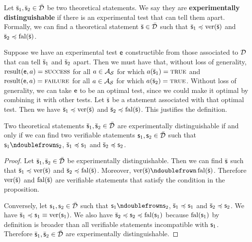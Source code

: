 \documentclass[11pt,letterpaper,fleqn]{memoir} %
\begin{document}
\begin{mathSection}
\begin{defn}\label{1_def_experimentally_distinguishable}
	Let $\bar{\mathsf{s}}_1, \bar{\mathsf{s}}_2 \in \bar{\mathcal{D}}$ be two theoretical statements. We say they are \textbf{experimentally distinguishable} if there is an experimental test that can tell them apart. Formally, we can find a theoretical statement $\bar{\mathsf{s}} \in \bar{\mathcal{D}}$ such that $\bar{\mathsf{s}}_1 \preccurlyeq \operatorname{ver}(\bar{\mathsf{s}})$ and $\bar{\mathsf{s}}_2 \preccurlyeq \operatorname{fal}(\bar{\mathsf{s}})$.
\end{defn}
\begin{justification}
	Suppose we have an experimental test $\mathsf{e}$ constructible from those associated to $\mathcal{D}$ that can tell $\bar{\mathsf{s}}_1$ and $\bar{\mathsf{s}}_2$ apart. Then we must have that, without loss of generality, $\operatorname{result}(\mathsf{e}, a) = \textsc{success}$ for all $a \in \mathcal{A}_{\mathcal{S}}$ for which $a(\bar{\mathsf{s}}_1) = \textsc{true}$ and $\operatorname{result}(\mathsf{e}, a) = \textsc{failure}$ for all $a \in \mathcal{A}_{\mathcal{S}}$ for which $a(\bar{\mathsf{s}}_2) = \textsc{true}$. Without loss of generality, we can take $\mathsf{e}$ to be an optimal test, since we could make it optimal by combining it with other tests. Let $\bar{\mathsf{s}}$ be a statement associated with that optimal test. Then we have $\bar{\mathsf{s}}_1 \preccurlyeq \operatorname{ver}(\bar{\mathsf{s}})$ and $\bar{\mathsf{s}}_2 \preccurlyeq \operatorname{fal}(\bar{\mathsf{s}})$. This justifies the definition.
\end{justification}

\begin{prop}\label{1_prop_experimentally_distinguishable_is_disjoint_approximations}
	Two theoretical statements $\bar{\mathsf{s}}_1, \bar{\mathsf{s}}_2 \in \bar{\mathcal{D}}$ are experimentally distinguishable if and only if we can find two verifiable statements $\mathsf{s}_1, \mathsf{s}_2 \in \bar{\mathcal{D}}$ such that $\stmt_1 \ncomp \stmt_2$, $\bar{\mathsf{s}}_1 \preccurlyeq \mathsf{s}_1$ and $\bar{\mathsf{s}}_2 \preccurlyeq \mathsf{s}_2$.
\end{prop}
\begin{proof}
	Let $\bar{\mathsf{s}}_1, \bar{\mathsf{s}}_2 \in \bar{\mathcal{D}}$ be experimentally distinguishable. Then we can find $\bar{\mathsf{s}}$ such that $\bar{\mathsf{s}}_1 \preccurlyeq \operatorname{ver}(\bar{\mathsf{s}})$ and $\bar{\mathsf{s}}_2 \preccurlyeq \operatorname{fal}(\bar{\mathsf{s}})$. Moreover, $\ver(\bar{\stmt}) \ncomp \fal(\bar{\stmt})$. Therefore $\operatorname{ver}(\bar{\mathsf{s}})$ and $\operatorname{fal}(\bar{\mathsf{s}})$ are verifiable statements that satisfy the condition in the proposition.
	
	Conversely, let $\mathsf{s}_1, \mathsf{s}_2 \in \bar{\mathcal{D}}$ such that $\stmt_1 \ncomp \stmt_2$, $\bar{\mathsf{s}}_1 \preccurlyeq \mathsf{s}_1$ and $\bar{\mathsf{s}}_2 \preccurlyeq \mathsf{s}_2$. We have $\bar{\mathsf{s}}_1 \preccurlyeq \mathsf{s}_1 \equiv \operatorname{ver}(\mathsf{s}_1)$. We also have $\bar{\mathsf{s}}_2 \preccurlyeq \mathsf{s}_2 \preccurlyeq \operatorname{fal}(\mathsf{s}_1)$ because $\operatorname{fal}(\mathsf{s}_1)$ by definition is broader than all verifiable statements incompatible with $\mathsf{s}_1$. Therefore $\bar{\mathsf{s}}_1, \bar{\mathsf{s}}_2 \in \bar{\mathcal{D}}$ are experimentally distinguishable.
\end{proof}
\end{mathSection}
\end{document}
